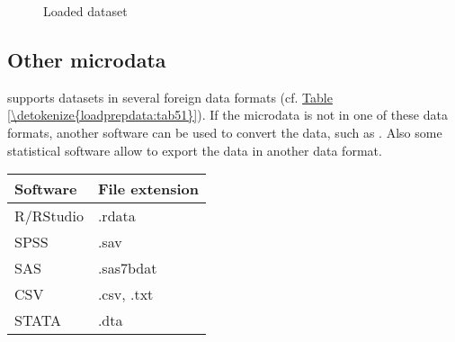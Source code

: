 \documentclass[letterpaper,10pt,english]{sphinxmanual}
\begin{document}
\begin{figure}[htbp]
\centering
\capstart

\noindent{}
\caption{Loaded dataset}\label{\detokenize{loadprepdata:fig52}}\label{\detokenize{loadprepdata:id2}}\end{figure}


\subsection{Other microdata}
\label{\detokenize{loadprepdata:other-microdata}}
 supports datasets in several foreign data formats (cf. \hyperref[\detokenize{loadprepdata:tab51}]{Table \ref{\detokenize{loadprepdata:tab51}}}).
If the microdata is not in one of these data formats, another software can be used
to convert the data, such as . Also some statistical software allow to export
the data in another data format.


\begin{savenotes}\sphinxattablestart
\centering
{}
\label{\detokenize{loadprepdata:tab51}}\label{\detokenize{loadprepdata:id3}}
\sphinxaftercaption
\begin{tabulary}{\linewidth}[t]{|T|T|}
\hline
\sphinxstyletheadfamily 
Software
&\sphinxstyletheadfamily 
File extension
\\
\hline
R/RStudio
&
.rdata
\\
\hline
SPSS
&
.sav
\\
\hline
SAS
&
.sas7bdat
\\
\hline
CSV
&
.csv, .txt
\\
\hline
STATA
&
.dta
\\
\hline
\end{tabulary}
\par
\sphinxattableend\end{savenotes}
\end{document}
